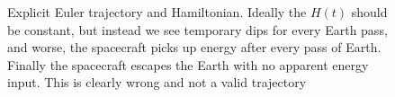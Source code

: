 \begin{figure}
    \centering
        \caption{Explicit Euler trajectory and Hamiltonian. Ideally the $H(t)$ should be constant, but instead we see temporary dips for every Earth pass, and worse, the spacecraft picks up energy after every pass of Earth. Finally the spacecraft escapes the Earth with no apparent energy input. This is clearly wrong and not a valid trajectory}
        \label{fig:r3b_explicit_euler}
\end{figure}

